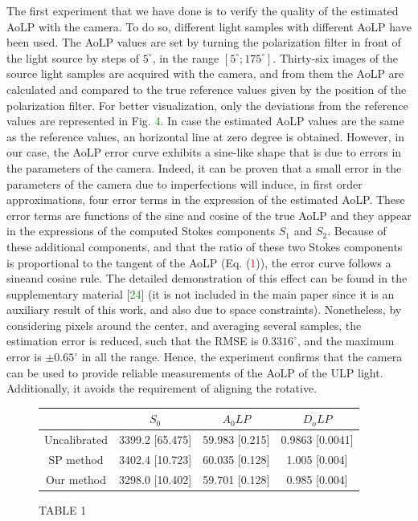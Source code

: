 \documentclass[10pt,twocolumn,letterpaper]{article}
\begin{document}
The first experiment that we have done is to verify the quality of the estimated AoLP with the camera. To do so, different light samples with different AoLP have been used. The AoLP values are set by turning the polarization filter in front of the light source by steps of $5^{\circ}$, in the range $[5^{\circ}; 175^{\circ}]$. Thirty-six images of the source light samples are acquired with the camera, and from them the AoLP are calculated and compared to the true reference values given by the position of the polarization filter. For better visualization, only the deviations from the reference values are represented in Fig. \textcolor{green}{4}. In case the estimated AoLP values are the same as the reference values, an horizontal line at zero degree is obtained. However, in our case, the AoLP error curve exhibits a sine-like shape that is due to errors in the parameters of the camera. Indeed, it can be proven that a small error in the parameters of the camera due to imperfections will induce, in first order approximations, four error terms in the expression of the estimated AoLP. These error terms are functions of the sine and cosine of the true AoLP and they appear in the expressions of the computed Stokes components $S_1$ and $S_2$. Because of these additional components, and that the ratio of these two Stokes components is proportional to the tangent of the AoLP (Eq. (\textcolor{red}{1})), the error curve follows a sineand cosine rule. The detailed demonstration of this effect can be found in the supplementary material [\textcolor{green}{24}] (it is not included in the main paper since it is an auxiliary result of this work, and also due to space constraints). Nonetheless, by considering pixels around the center, and averaging several samples, the estimation error is reduced, such that the RMSE is $0.3316^{\circ}$, and the maximum error is $\pm 0.65^{\circ}$ in all the range. Hence, the experiment confirms that the camera can be used to provide reliable measurements of the AoLP of the ULP light. Additionally, it avoids the requirement of aligning the rotative.

\begin{figure}
    \centering
    \begin{tabular}{|c|c|c|c|}
        \hline
         &  
        $S_0$ & 
        $A_0LP$ & 
        $D_oLP$ \\
        \hline
        Uncalibrated & 3399.2 [65.475] & 59.983 [0.215]& 0.9863 [0.0041]\\
         \hline
         SP method & 3402.4 [10.723] & 60.035 [0.128] & 1.005 [0.004] \\
         \hline
         Our method & 3298.0 [10.402] & 59.701 [0.128] & 0.985 [0.004] \\
         \hline
    \end{tabular}
    \caption{TABLE 1}
    \label{fig:my_label}
\end{figure}

{\small


}
\end{document}
